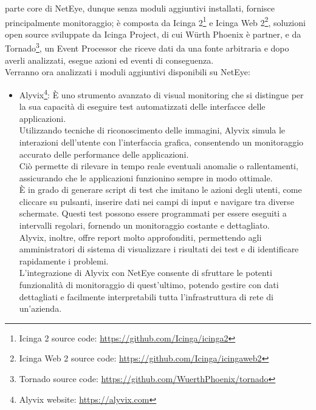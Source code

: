 parte core di NetEye, dunque senza moduli aggiuntivi installati, fornisce
principalmente monitoraggio; è composta da Icinga 2\footnote{Icinga 2 source
code: \url{https://github.com/Icinga/icinga2}} e Icinga Web 2\footnote{Icinga
Web 2 source code: \url{https://github.com/Icinga/icingaweb2}}, soluzioni open
source sviluppate da Icinga Project, di cui Würth Phoenix è partner, e da
Tornado\footnote{Tornado source code: \url{https://github.com/WuerthPhoenix/tornado}},
un Event Processor che riceve dati da una fonte arbitraria e dopo averli
analizzati, esegue azioni ed eventi di conseguenza.\\ Verranno ora analizzati i moduli
aggiuntivi disponibili su NetEye:
\begin{itemize}
  \item Alyvix\footnote{Alyvix website: \url{https://alyvix.com}}: È uno strumento
    avanzato di visual monitoring che si distingue per la sua capacità di eseguire
    test automatizzati delle interfacce delle applicazioni.\\ Utilizzando tecniche
    di riconoscimento delle immagini, Alyvix simula le interazioni dell'utente
    con l'interfaccia grafica, consentendo un monitoraggio accurato delle performance
    delle applicazioni.\\ Ciò permette di rilevare in tempo reale eventuali anomalie
    o rallentamenti, assicurando che le applicazioni funzionino sempre in modo
    ottimale.\\ È in grado di generare script di test che imitano le azioni
    degli utenti, come cliccare su pulsanti, inserire dati nei campi di input e
    navigare tra diverse schermate. Questi test possono essere programmati per essere
    eseguiti a intervalli regolari, fornendo un monitoraggio costante e
    dettagliato.\\ Alyvix, inoltre, offre report molto approfonditi, permettendo
    agli amministratori di sistema di visualizzare i risultati dei test e di identificare
    rapidamente i problemi.\\ L'integrazione di Alyvix con NetEye consente di sfruttare
    le potenti funzionalità di monitoraggio di quest'ultimo, potendo gestire con
    dati dettagliati e facilmente interpretabili tutta l'infrastruttura di rete
    di un'azienda.


\end{itemize}
